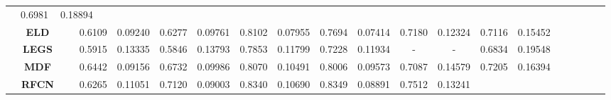\documentclass[10pt,twocolumn,letterpaper]{article}
\begin{document}
\begin{table}
\begin{center}
\begin{tabular}{|c|c|c|c|c|c|c|c|c|c|c|c|c|c|c|c|c|c|c|c|c|c|c|c|c|||c|c|c|c|c|c|c|c|||}
&\multicolumn{2}{|c|}{0.6981}&\multicolumn{2}{|c|}{0.18894}%
\\
\multicolumn{4}{|c|}{\textbf{ELD}~\cite{lee2016deep}}
&\multicolumn{2}{|c|}{0.6109}&\multicolumn{2}{|c|}{\textcolor[rgb]{0,1,0}{0.09240}}%
&\multicolumn{2}{|c|}{0.6277}&\multicolumn{2}{|c|}{0.09761}%
&\multicolumn{2}{|c|}{0.8102}&\multicolumn{2}{|c|}{0.07955}%
&\multicolumn{2}{|c|}{0.7694}&\multicolumn{2}{|c|}{0.07414}%
&\multicolumn{2}{|c|}{0.7180}&\multicolumn{2}{|c|}{0.12324}%
&\multicolumn{2}{|c|}{0.7116}&\multicolumn{2}{|c|}{0.15452}%
\\
\multicolumn{4}{|c|}{\textbf{LEGS}~\cite{wang2015deep}}
&\multicolumn{2}{|c|}{0.5915}&\multicolumn{2}{|c|}{0.13335}%
&\multicolumn{2}{|c|}{0.5846}&\multicolumn{2}{|c|}{0.13793}%
&\multicolumn{2}{|c|}{0.7853}&\multicolumn{2}{|c|}{0.11799}%
&\multicolumn{2}{|c|}{0.7228}&\multicolumn{2}{|c|}{0.11934}%
&\multicolumn{2}{|c|}{-}&\multicolumn{2}{|c|}{-}%
&\multicolumn{2}{|c|}{0.6834}&\multicolumn{2}{|c|}{0.19548}%
\\
\multicolumn{4}{|c|}{\textbf{MDF}~\cite{zhao2015saliency}}
&\multicolumn{2}{|c|}{\textcolor[rgb]{0,0,1}{0.6442}}&\multicolumn{2}{|c|}{\textcolor[rgb]{1,0,0}{0.09156}}%
&\multicolumn{2}{|c|}{0.6732}&\multicolumn{2}{|c|}{0.09986}%
&\multicolumn{2}{|c|}{0.8070}&\multicolumn{2}{|c|}{0.10491}%
&\multicolumn{2}{|c|}{0.8006}&\multicolumn{2}{|c|}{0.09573}%
&\multicolumn{2}{|c|}{0.7087}&\multicolumn{2}{|c|}{0.14579}%
&\multicolumn{2}{|c|}{0.7205}&\multicolumn{2}{|c|}{0.16394}%
\\
\multicolumn{4}{|c|}{\textbf{RFCN}~\cite{wang2016saliency}}
&\multicolumn{2}{|c|}{0.6265}&\multicolumn{2}{|c|}{0.11051}%
&\multicolumn{2}{|c|}{0.7120}&\multicolumn{2}{|c|}{0.09003}%
&\multicolumn{2}{|c|}{0.8340}&\multicolumn{2}{|c|}{0.10690}%
&\multicolumn{2}{|c|}{0.8349}&\multicolumn{2}{|c|}{0.08891}%
&\multicolumn{2}{|c|}{0.7512}&\multicolumn{2}{|c|}{0.13241}%

\end{tabular}
\end{center}
\end{table}
\end{document}
